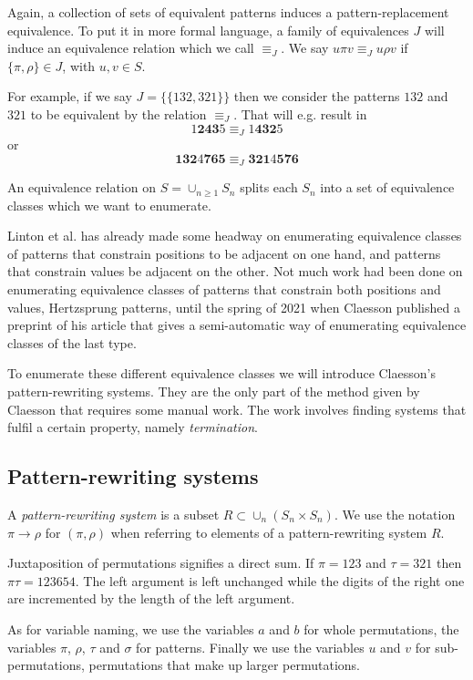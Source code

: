 \documentclass[a4paper, 11pt, english]{article}
\newcommand{\patternrule}{ \to \!}
\theoremstyle{definition}
\newcommand{\Sym}{S}
\begin{document}
Again, a collection of sets of equivalent patterns induces a pattern-replacement equivalence.
To put it in more formal language, a family of equivalences $J$ will induce an equivalence relation
which we call $\equiv_J$. We say $u \pi v \equiv_J u \rho v$ if $\{ \pi, \rho \} \in J$, with $u,v
\in \Sym$.

For example, if we say $J = \{ \{ 132, 321 \} \}$ then we consider the patterns $132$ and $321$ to
be equivalent by the relation $\equiv_J$. That will e.g. result in
\[
    1\bm{243}5 \equiv_J 1\bm{432}5
\]
or
\[
  \bm{132}4\bm{765} \equiv_J \bm{321}4\bm{576}
\]

An equivalence relation on $\Sym = \cup_{n \geq 1} \Sym_n$ splits each $\Sym_n$
into a set of equivalence classes which we want to enumerate. 

Linton et al. has already made some headway on enumerating equivalence classes of patterns that constrain
positions to be adjacent on one hand, and patterns that constrain values be adjacent on the other.
Not much work had been done on enumerating equivalence classes of patterns that constrain both
positions and values, Hertzsprung patterns, until the spring of 2021 when Claesson published a
preprint of his article \cite{claesson:2021} that gives a semi-automatic way of enumerating equivalence classes of the
last type.

To enumerate these different equivalence classes we will introduce Claesson's 
pattern-rewriting systems. They are the only part of the method given by Claesson that requires
some manual work. The work involves finding systems that fulfil a certain property, namely
\emph{termination}.

\subsection{Pattern-rewriting systems}
A \emph{pattern-rewriting system} is a subset $R \subset \cup_{n} (\Sym_n \times \Sym_n)$.
We use the notation $\pi \patternrule \rho$ for $(\pi, \rho)$ when referring
to elements of a pattern-rewriting system $R$.

Juxtaposition of permutations signifies a direct sum. If $\pi=123$ and
$\tau=321$ then $\pi\tau=123654$. The left argument is left unchanged while the
digits of the right one are incremented by the length of the left argument.

As for variable naming, we use the variables $a$ and $b$ for whole permutations, 
the variables $\pi$, $\rho$, $\tau$ and $\sigma$ for patterns.
Finally we use the variables $u$ and $v$ for sub-permutations, permutations that make up larger
permutations.
\end{document}
